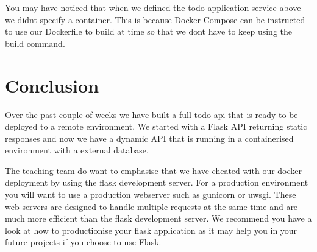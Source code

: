 \documentclass{csse4400}
\begin{document}
You may have noticed that when we defined the todo application service above we didnt specify a container. This is because Docker Compose can be instructed to use our Dockerfile to build at time so that we dont have to keep using the build command.








\section{Conclusion}

Over the past couple of weeks we have built a full todo api that is ready to be deployed to a remote environment. We started with a Flask API returning static responses and now we have a dynamic API that is running in a containerised environment with a external database.

The teaching team do want to emphasise that we have cheated with our docker deployment by using the flask development server. For a production environment you will want to use a production webserver such as gunicorn or uwsgi. These web servers are designed to handle multiple requests at the same time and are much more efficient than the flask development server. We recommend you have a look at how to productionise your flask application as it may help you in your future projects if you choose to use Flask.



\end{document}

